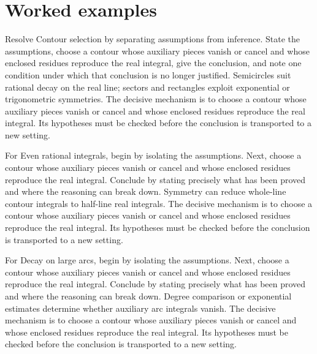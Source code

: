 \section{Worked examples}

\begin{example}\label{ex:iv11-worked-01}
Resolve Contour selection by separating assumptions from inference. State the assumptions, choose a contour whose auxiliary pieces vanish or cancel and whose enclosed residues reproduce the real integral, give the conclusion, and note one condition under which that conclusion is no longer justified. Semicircles suit rational decay on the real line; sectors and rectangles exploit exponential or trigonometric symmetries. The decisive mechanism is to choose a contour whose auxiliary pieces vanish or cancel and whose enclosed residues reproduce the real integral. Its hypotheses must be checked before the conclusion is transported to a new setting.
\end{example}

\begin{example}\label{ex:iv11-worked-02}
For Even rational integrals, begin by isolating the assumptions. Next, choose a contour whose auxiliary pieces vanish or cancel and whose enclosed residues reproduce the real integral. Conclude by stating precisely what has been proved and where the reasoning can break down. Symmetry can reduce whole-line contour integrals to half-line real integrals. The decisive mechanism is to choose a contour whose auxiliary pieces vanish or cancel and whose enclosed residues reproduce the real integral. Its hypotheses must be checked before the conclusion is transported to a new setting.
\end{example}

\begin{example}\label{ex:iv11-worked-03}
For Decay on large arcs, begin by isolating the assumptions. Next, choose a contour whose auxiliary pieces vanish or cancel and whose enclosed residues reproduce the real integral. Conclude by stating precisely what has been proved and where the reasoning can break down. Degree comparison or exponential estimates determine whether auxiliary arc integrals vanish. The decisive mechanism is to choose a contour whose auxiliary pieces vanish or cancel and whose enclosed residues reproduce the real integral. Its hypotheses must be checked before the conclusion is transported to a new setting.
\end{example}


